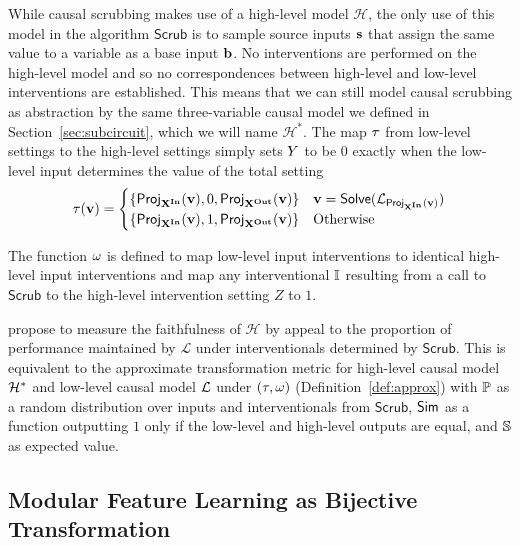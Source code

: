 \documentclass[twoside,11pt]{article}
\begin{document}
While causal scrubbing makes use of a high-level model $\mathcal{H}$, the only use of this model in the algorithm $\mathsf{Scrub}$ is to sample source inputs $\mathbf{s}$ that assign the same value to a variable as a base input $\mathbf{b}$. No interventions are performed on the high-level model and so no correspondences between high-level and low-level interventions are established. This means that we can still model causal scrubbing as abstraction by the same three-variable causal model we defined in Section~\ref{sec:subcircuit}, which we will name $\mathcal{H}^*$. The map $\tau$ from low-level settings to the high-level settings simply sets $Y$ to be $0$ exactly when the low-level input determines the value of the total setting
\[\tau(\mathbf{v}) = \begin{cases} 
\{\mathsf{Proj}_{\mathbf{X}^{\mathbf{In}}}(\mathbf{v}), 0,\mathsf{Proj}_{\mathbf{X}^{\mathbf{Out}}}(\mathbf{v}) \} &   \mathbf{v} = \mathsf{Solve}(\mathcal{L}_{\mathsf{Proj}_{\mathbf{X}^{\mathbf{In}}}(\mathbf{v})}) \\ 
\{\mathsf{Proj}_{\mathbf{X}^{\mathbf{In}}}(\mathbf{v}), 1,\mathsf{Proj}_{\mathbf{X}^{\mathbf{Out}}}(\mathbf{v}) \} & \text{Otherwise} \\
\end{cases}\]


The function $\omega$ is defined to map low-level input interventions to identical high-level input interventions and map any interventional $\mathbb{I}$ resulting from a call to $\mathsf{Scrub}$ to the high-level intervention setting $Z$ to $1$.

\cite{chan2022causal} propose to measure the faithfulness of $\mathcal{H}$ by appeal to the proportion of performance maintained by $\mathcal{L}$ under interventionals determined by $\mathsf{Scrub}$. This is equivalent to the approximate transformation metric for high-level causal model $\mathcal{H}^*$ and low-level causal model $\mathcal{L}$ under $(\tau, \omega)$ (Definition~\ref{def:approx}) with $\mathbb{P}$ as a random distribution over inputs and interventionals from $\mathsf{Scrub}$, $\mathsf{Sim}$ as a function outputting $1$ only if the low-level and high-level outputs are equal, and $\mathbb{S}$ as expected value.

\subsection{Modular Feature Learning as Bijective Transformation}\label{sec:localization}
\end{document}
